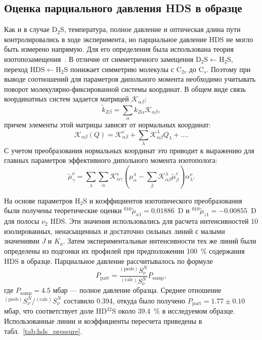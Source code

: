 \subsection{Оценка парциального давления HDS в образце}

Как и в случае D$_2$S, температура, полное давление и оптическая длина пути контролировались в ходе
эксперимента, но парциальное давление HDS не могло быть измерено напрямую. Для его определения была
использована теория изотопозамещения~\cite{byk}. В отличие от симметричного замещения
D$_2$S$\leftarrow$H$_2$S, переход HDS$\leftarrow$H$_2$S понижает симметрию молекулы с C$_{2v}$ до C$_s$.
Поэтому при выводе соотношений для параметров дипольного момента необходимо учитывать поворот
молекулярно-фиксированной системы координат. В общем виде связь координатных систем задается
матрицей $\mathscr{K}_{\alpha\beta}$:
\begin{equation}
\widetilde{k}_{Z\beta}=\sum_{\alpha} k_{Z\alpha}\mathscr{K}_{\alpha\beta},
\label{eq:hds_k_rotation}
\end{equation}
причем элементы этой матрицы зависят от нормальных координат:
\begin{equation}
\mathscr{K}_{\alpha\beta}(Q)=\mathscr{K}^{e}_{\alpha\beta}+
\sum_{\lambda}\mathscr{K}^{\lambda}_{\alpha\beta}Q_{\lambda}+\ldots .
\label{eq:hds_k_expansion}
\end{equation}
С учетом преобразования нормальных координат это приводит к выражению для главных параметров
эффективного дипольного момента изотополога:
\begin{equation}
\widetilde{\mu}^{\nu}_{\gamma}=\sum_{\lambda}\sum_{\alpha}
\mathscr{K}^{e}_{\alpha\gamma}
\left(\mu^{\lambda}_{\alpha}-\sum_{\beta}\mathscr{K}^{\lambda}_{\alpha\beta}
\widetilde{\mu}^{e}_{\beta}\right)\alpha^{\nu}_{\lambda}.
\label{eq:hds_mu_iso_general}
\end{equation}

На основе параметров H$_2$S и коэффициентов изотопического преобразования были получены теоретические
оценки ${}^{010}\widetilde{\mu}_{x1}=0.01886$~D и
${}^{010}\widetilde{\mu}_{z1}=-0.00855$~D для полосы $\nu_2$ HDS. Эти значения использовались для
расчета интенсивностей 10 изолированных, ненасыщенных и достаточно сильных линий с малыми значениями
$J$ и $K_a$. Затем экспериментальные интенсивности тех же линий были определены из подгонки их
профилей при предположении 100~\% содержания HDS в образце. Парциальное давление рассчитывалось по
формуле
\begin{equation}
P_{\textrm{part}}=\frac{{}^{(\textrm{prob})}S^{N}_{\nu}}{{}^{(\textrm{calc})}S^{N}_{\nu}}
P_{\textrm{samp}},
\label{eq:hds_partial_pressure}
\end{equation}
где $P_{\textrm{samp}}=4.5$ мбар --- полное давление образца. Среднее отношение
${}^{(\textrm{prob})}S^{N}_{\nu}/{}^{(\textrm{calc})}S^{N}_{\nu}$ составило 0.394, откуда было получено
$P_{\textrm{part}}=1.77\pm0.10$ мбар, что соответствует доле HD$^{32}$S около 39.4~\% в исследуемом
образце. Использованные линии и коэффициенты пересчета приведены в табл.~\ref{tab:hds_pressure}.


